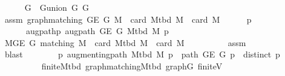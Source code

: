 \begin{isabellebody}
\ \ \ \ \isamarkupfalse%
\ {\isacharquery}{\kern0pt}G\ {\isacharequal}{\kern0pt}\ {\isachardoublequoteopen}G{\isachardot}{\kern0pt}union\ {\isacharquery}{\kern0pt}G{}\ {\isacharquery}{\kern0pt}G{}{\isachardoublequoteclose}\isanewline
\ \ \ \ \isamarkupfalse%
\ assm{\isacharcolon}{\kern0pt}\ {\isachardoublequoteopen}graph{\isacharunderscore}{\kern0pt}matching\ {\isacharparenleft}{\kern0pt}G{\isachardot}{\kern0pt}E\ G{\isacharparenright}{\kern0pt}\ M{\isacharprime}{\kern0pt}\ {\isasymand}\ card\ {\isacharparenleft}{\kern0pt}M{\isacharunderscore}{\kern0pt}tbd\ M{\isacharparenright}{\kern0pt}\ {\isacharless}{\kern0pt}\ card\ M{\isacharprime}{\kern0pt}{\isachardoublequoteclose}\isanewline
\ \ \ \ \isamarkupfalse%
\ p\ \isanewline
\ \ \ \ \ \ augpath{\isacharunderscore}{\kern0pt}p{\isacharcolon}{\kern0pt}\ {\isachardoublequoteopen}augpath\ {\isacharparenleft}{\kern0pt}G{\isachardot}{\kern0pt}E\ G{\isacharparenright}{\kern0pt}\ {\isacharparenleft}{\kern0pt}M{\isacharunderscore}{\kern0pt}tbd\ M{\isacharparenright}{\kern0pt}\ p{\isachardoublequoteclose}\isanewline
\ \ \ \ \isamarkupfalse%
\ {\isacharminus}{\kern0pt}\isanewline
\ \ \ \ \ \ \isamarkupfalse%
\ {\isachardoublequoteopen}{\isasymexists}M{\isacharprime}{\kern0pt}{\isasymsubseteq}{\isacharparenleft}{\kern0pt}G{\isachardot}{\kern0pt}E\ G{\isacharparenright}{\kern0pt}{\isachardot}{\kern0pt}\ matching\ M{\isacharprime}{\kern0pt}\ {\isasymand}\ card\ {\isacharparenleft}{\kern0pt}M{\isacharunderscore}{\kern0pt}tbd\ M{\isacharparenright}{\kern0pt}\ {\isacharless}{\kern0pt}\ card\ M{\isacharprime}{\kern0pt}{\isachardoublequoteclose}\isanewline
\ \ \ \ \ \ \ \ \isamarkupfalse%
\ assm\isanewline
\ \ \ \ \ \ \ \ \isamarkupfalse%
\ blast\isanewline
\ \ \ \ \ \ \isamarkupfalse%
\ {\isachardoublequoteopen}{\isasymexists}p{\isachardot}{\kern0pt}\ augmenting{\isacharunderscore}{\kern0pt}path\ {\isacharparenleft}{\kern0pt}M{\isacharunderscore}{\kern0pt}tbd\ M{\isacharparenright}{\kern0pt}\ p\ {\isasymand}\ path\ {\isacharparenleft}{\kern0pt}G{\isachardot}{\kern0pt}E\ G{\isacharparenright}{\kern0pt}\ p\ {\isasymand}\ distinct\ p{\isachardoublequoteclose}\isanewline
\ \ \ \ \ \ \ \ \isamarkupfalse%
\ finite{\isacharunderscore}{\kern0pt}M{\isacharunderscore}{\kern0pt}tbd\ graph{\isacharunderscore}{\kern0pt}matching{\isacharunderscore}{\kern0pt}M{\isacharunderscore}{\kern0pt}tbd\ graph{\isacharunderscore}{\kern0pt}G\ finite{\isacharunderscore}{\kern0pt}V\isanewline

\end{isabellebody}
